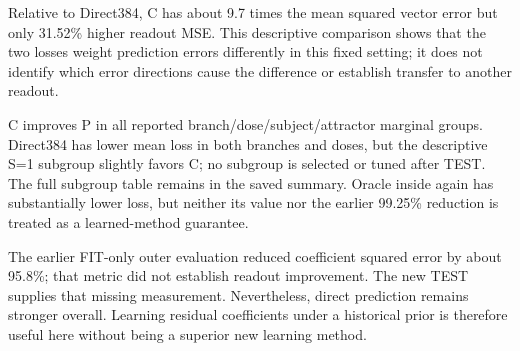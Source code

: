 Relative to Direct384, C has about 9.7 times the mean squared vector error but only 31.52\% higher readout MSE. This descriptive comparison shows that the two losses weight prediction errors differently in this fixed setting; it does not identify which error directions cause the difference or establish transfer to another readout.

C improves P in all reported branch/dose/subject/attractor marginal groups. Direct384 has lower mean loss in both branches and doses, but the descriptive S=1 subgroup slightly favors C; no subgroup is selected or tuned after TEST. The full subgroup table remains in the saved summary. Oracle inside again has substantially lower loss, but neither its value nor the earlier 99.25\% reduction is treated as a learned-method guarantee.

The earlier FIT-only outer evaluation reduced coefficient squared error by about 95.8\%; that metric did not establish readout improvement. The new TEST supplies that missing measurement. Nevertheless, direct prediction remains stronger overall. Learning residual coefficients under a historical prior is therefore useful here without being a superior new learning method.

